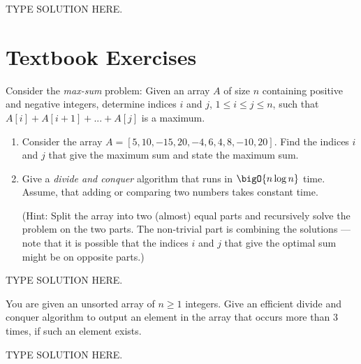 \documentclass[draft]{article}
\begin{document}
\begin{solution}
    TYPE SOLUTION HERE.
\end{solution}

\section{Textbook Exercises}
\begin{exercise}{5.18}
    Consider the \emph{max-sum} problem: Given an array $A$ of size $n$ containing positive and negative integers, determine indices $i$ and $j$, $1 \leq i \leq j \leq n$, such that $A[i] + A[i+1] + ... + A[j]$ is a maximum.
    \begin{enumerate}[label=(\alph*)]
        \item Consider the array $A = [5, 10, -15, 20, -4, 6, 4, 8, -10, 20]$. Find the indices $i$ and $j$ that give the maximum sum and state the maximum sum.
        \item Give a \emph{divide and conquer} algorithm that runs in  $\bigO{n\log{n}}$ time. Assume, that adding or comparing two numbers takes constant time.

              (Hint: Split the array into two (almost) equal parts and recursively solve the problem on the two parts. The non-trivial part is combining the solutions --- note that it is possible that the indices $i$ and $j$ that give the optimal sum might be on opposite parts.)
    \end{enumerate}
\end{exercise}

\begin{solution}
    TYPE SOLUTION HERE.
\end{solution}

\begin{exercise}{5.23}
    You are given an unsorted array of $n \geq 1$ integers. Give an efficient divide and conquer algorithm to output an element in the array that occurs more than 3 times, if such an element exists.
\end{exercise}

\begin{solution}
    TYPE SOLUTION HERE.
\end{solution}
\end{document}
